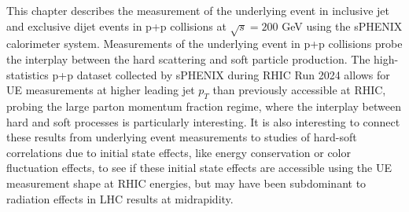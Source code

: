 This chapter describes the measurement of the underlying event in inclusive jet and exclusive dijet events in p+p collisions at $\sqrt{s} = 200$ GeV using the sPHENIX calorimeter system. Measurements of the underlying event in p+p collisions probe the interplay between the hard scattering and soft particle production. 
The high-statistics p+p dataset collected by sPHENIX during RHIC Run 2024 allows for UE measurements at higher leading jet $p_{T}$ than previously accessible at RHIC, probing the large parton momentum fraction regime, where the interplay between hard and soft processes is particularly interesting.
It is also interesting to connect these results from underlying event measurements to studies of hard-soft correlations due to initial state effects, like energy conservation or color fluctuation effects, to see if these initial state effects are accessible using the UE measurement shape at RHIC energies, but may have been subdominant to radiation effects in LHC results at midrapidity.

